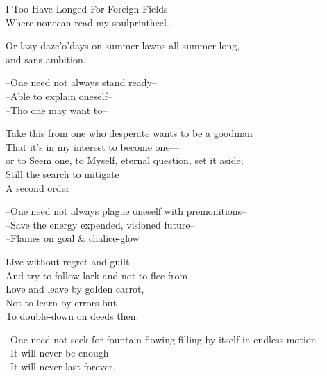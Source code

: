 I Too Have Longed For Foreign Fields \\
Where nonecan read my soulprintheel. 

Or lazy daze'o'days on summer lawns all summer long, \\
and sans ambition.

--One need not always stand ready-- \\
--Able to explain oneself-- \\
--Tho one may want to--

Take this from one who desperate wants to be a goodman \\
That it's in my interest to become one— \\
or to Seem one, to Myself, eternal question, set it aside; \\
Still the search to mitigate \\
A second order  

--One need not always plague oneself with premonitions-- \\
--Save the energy expended, visioned future-- \\
--Flames on goal \& chalice-glow

Live without regret and guilt \\
And try to follow lark and not to flee from \\
Love and leave by golden carrot, \\
Not to learn by errors but \\
To double-down on deeds then.

--One need not seek for fountain flowing filling by itself in endless motion-- \\
--It will never be enough-- \\
--It will never last forever. 